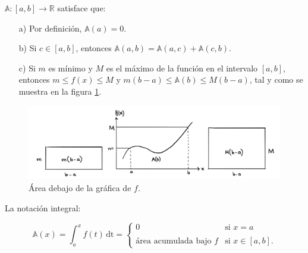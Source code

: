 \documentclass{article}
\numberwithin{equation}{section}
\begin{document}
$\mathbb{A}:[a,b]\longrightarrow\mathbb{R}$ satisface que:
\begin{enumerate}
    \item[a)] Por definición, $\mathbb{A}(a)=0$.
    \item[b)] Si $c\in [a,b]$, entonces $\mathbb{A}(a,b)=\mathbb{A}(a,c)+\mathbb{A}(c,b)$.
    \item[c)] Si $m$ es mínimo y $M$ es el máximo de la función en el intervalo $[a,b]$, entonces $m\leq f(x)\leq M$ y $m(b-a)\leq \mathbb{A}(b)\leq M(b-a)$, tal y como se muestra en la figura \ref{fig:fig2}.
\end{enumerate} 

\begin{figure}[h]
    \centering
    \includegraphics[scale=0.4]{images/fig2.png}
    \caption{Área debajo de la gráfica de $f$.}
    \label{fig:fig2}
\end{figure}

La notación integral: 

$$ \mathbb{A}(x)=\int_{a}^{x} \! {f(t)} \, \mathrm{dt} =
\left\{
    \begin{array}{ll}
        0  & \mbox{si } x=a \\
        \\ \mbox{área acumulada bajo $f$} & \mbox{si } x\in [a,b].
    \end{array}
\right.$$
\end{document}
